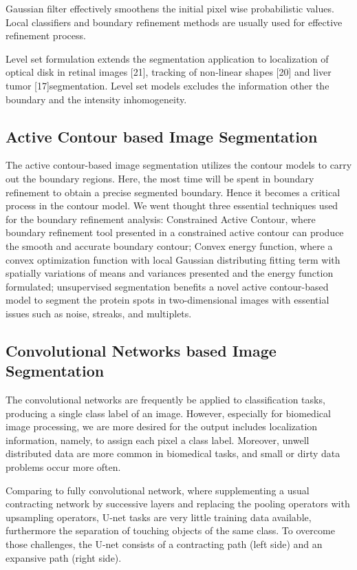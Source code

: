 Gaussian filter effectively smoothens the initial pixel wise probabilistic values. Local classifiers and boundary refinement methods are usually used for effective refinement process.

Level set formulation extends the segmentation application to localization of optical disk in retinal images [21], tracking of non-linear shapes [20] and liver tumor [17]segmentation. Level set models excludes the information other the boundary and the intensity inhomogeneity.


\subsection{ Active Contour based Image Segmentation }

The active contour-based image segmentation utilizes the contour models to carry out the boundary regions. Here, the most time will be spent in boundary refinement to obtain a precise segmented boundary. Hence it becomes a critical process in the contour model. We went thought three essential techniques used for the boundary refinement analysis: Constrained Active  Contour, where boundary refinement tool presented in a constrained active contour can produce the smooth and accurate boundary contour; Convex energy function, where a convex optimization function with local Gaussian distributing fitting term with spatially variations of means and variances presented and the energy function formulated; unsupervised segmentation benefits a novel active contour-based model to segment the protein spots in two-dimensional images with essential issues such as noise, streaks, and multiplets.


\subsection{ Convolutional Networks based Image Segmentation }

The convolutional networks are frequently be applied to classification tasks, producing a single class label of an image. However, especially for biomedical image processing, we are more desired for the output includes localization information,  namely, to assign each pixel a class label. \cite{unet} Moreover, unwell distributed data are more common in biomedical tasks, and small or dirty data problems occur more often. 

Comparing to fully convolutional network, where supplementing a usual contracting network by successive layers and replacing the pooling operators with upsampling operators,  U-net tasks are very little training data available, furthermore the separation of touching objects of the same class. To overcome those challenges, the U-net consists of a contracting path (left side) and an expansive path (right side). 

